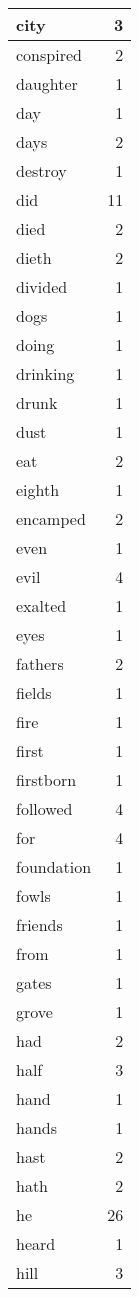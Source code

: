 \begin{center}
\begin{longtable}{l|r}
city & 3\\ \hline 
conspired & 2\\ \hline 
daughter & 1\\ \hline 
day & 1\\ \hline 
days & 2\\ \hline 
destroy & 1\\ \hline 
did & 11\\ \hline 
died & 2\\ \hline 
dieth & 2\\ \hline 
divided & 1\\ \hline 
dogs & 1\\ \hline 
doing & 1\\ \hline 
drinking & 1\\ \hline 
drunk & 1\\ \hline 
dust & 1\\ \hline 
eat & 2\\ \hline 
eighth & 1\\ \hline 
encamped & 2\\ \hline 
even & 1\\ \hline 
evil & 4\\ \hline 
exalted & 1\\ \hline 
eyes & 1\\ \hline 
fathers & 2\\ \hline 
fields & 1\\ \hline 
fire & 1\\ \hline 
first & 1\\ \hline 
firstborn & 1\\ \hline 
followed & 4\\ \hline 
for & 4\\ \hline 
foundation & 1\\ \hline 
fowls & 1\\ \hline 
friends & 1\\ \hline 
from & 1\\ \hline 
gates & 1\\ \hline 
grove & 1\\ \hline 
had & 2\\ \hline 
half & 3\\ \hline 
hand & 1\\ \hline 
hands & 1\\ \hline 
hast & 2\\ \hline 
hath & 2\\ \hline 
he & 26\\ \hline 
heard & 1\\ \hline 
hill & 3\\ \hline 

\end{longtable}
\end{center}

